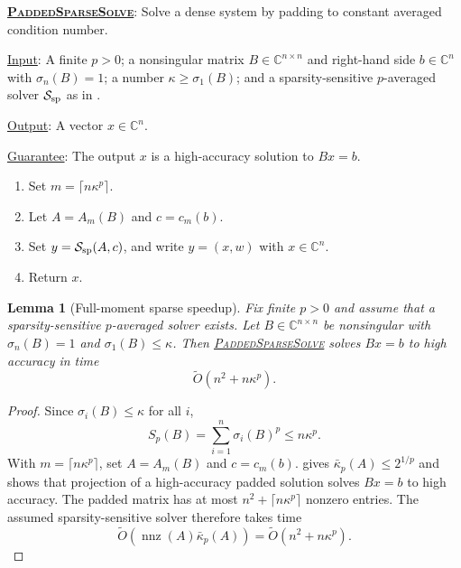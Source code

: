 \documentclass[11pt]{article}
\newenvironment{fminipage}%
  {\begin{Sbox}\begin{minipage}}%
  {\end{minipage}\end{Sbox}\fbox{\TheSbox}}
\newenvironment{algbox}[0]{%
\vskip 0.2in
\noindent
\begin{fminipage}{6.3in}
}{%
\end{fminipage}
\vskip 0.2in
}
\newtheorem{lemma}{Lemma}[section]
\begin{document}
\begin{algbox}
\textbf{\uline{\textsc{PaddedSparseSolve}}}: Solve a dense system by padding
to constant averaged condition number.
\label{alg:padded-sparse-solve}

\uline{Input}: A finite $p>0$; a nonsingular matrix
$B\in\mathbb{C}^{n\times n}$ and right-hand side $b\in\mathbb{C}^n$ with
$\sigma_n(B)=1$; a number $\kappa\geq\sigma_1(B)$; and a sparsity-sensitive
$p$-averaged solver $\mathcal{S}_{\rm sp}$ as in
.

\uline{Output}: A vector $x\in\mathbb{C}^n$.

\uline{Guarantee}: The output $x$ is a high-accuracy solution to $Bx=b$.

\begin{enumerate}[leftmargin=*]
  \item Set $m=\lceil n\kappa^p\rceil$.
  \item Let $A=A_m(B)$ and $c=c_m(b)$.
  \item Set $y=\mathcal{S}_{\rm sp}(A,c)$, and write $y=(x,w)$ with
  $x\in\mathbb{C}^n$.
  \item Return $x$.
\end{enumerate}
\end{algbox}

\begin{lemma}[Full-moment sparse speedup]
\label{lem:dense-instance-speedup}
Fix finite $p>0$ and assume that a sparsity-sensitive $p$-averaged solver
exists.  Let $B\in\mathbb{C}^{n\times n}$ be nonsingular with
$\sigma_n(B)=1$ and $\sigma_1(B)\leq\kappa$.  Then
\hyperref[alg:padded-sparse-solve]{\textsc{PaddedSparseSolve}} solves
$Bx=b$ to high accuracy in time
\[
  \widetilde{O}(n^2+n\kappa^p).
\]
\end{lemma}

\begin{proof}
Since $\sigma_i(B)\leq\kappa$ for all $i$,
\[
  S_p(B)=\sum_{i=1}^n \sigma_i(B)^p\leq n\kappa^p.
\]
With $m=\lceil n\kappa^p\rceil$, set $A=A_m(B)$ and $c=c_m(b)$.
 gives
$\bar{\kappa}_p(A)\leq 2^{1/p}$ and shows that
projection of a high-accuracy padded solution solves $Bx=b$ to high accuracy.
The padded matrix has at most $n^2+\lceil n\kappa^p\rceil$ nonzero entries.
The assumed sparsity-sensitive solver therefore takes time
\[
  \widetilde{O}\left(
  \operatorname{nnz}(A)\bar{\kappa}_p(A)
  \right)
  =
  \widetilde{O}(n^2+n\kappa^p).
\]
\end{proof}
\end{document}
